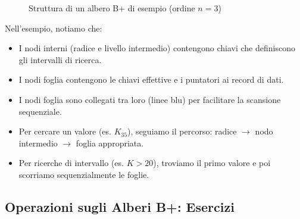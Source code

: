 \begin{figure}[H]
{
}
\caption{Struttura di un albero B+ di esempio (ordine $n=3$)}
\end{figure}

Nell'esempio, notiamo che:
\begin{itemize}
    \item I nodi interni (radice e livello intermedio) contengono chiavi che definiscono gli intervalli di ricerca.
    \item I nodi foglia contengono le chiavi effettive e i puntatori ai record di dati.
    \item I nodi foglia sono collegati tra loro (linee blu) per facilitare la scansione sequenziale.
    \item Per cercare un valore (es. $K_{35}$), seguiamo il percorso: radice $\rightarrow$ nodo intermedio $\rightarrow$ foglia appropriata.
    \item Per ricerche di intervallo (es. $K > 20$), troviamo il primo valore e poi scorriamo sequenzialmente le foglie.
\end{itemize}

\subsection{Operazioni sugli Alberi B+: Esercizi}

